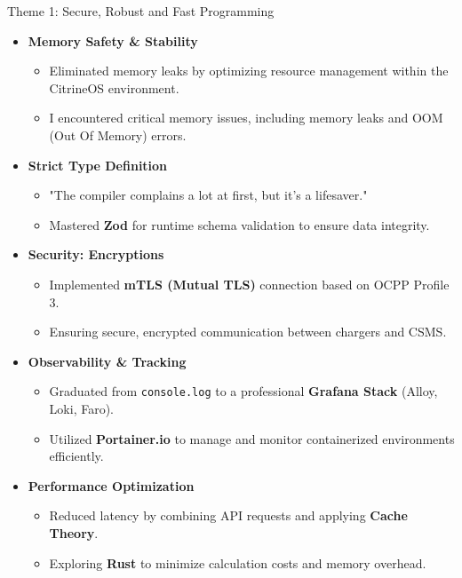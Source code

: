\documentclass[11pt]{beamer}
\begin{document}
\begin{frame}[allowframebreaks]{Theme 1: Secure, Robust and Fast Programming}
    \begin{itemize}
        \item \textbf{Memory Safety \& Stability}
            \begin{itemize}
                \item Eliminated memory leaks by optimizing resource management within the CitrineOS environment.
                \item I encountered critical memory issues, including memory leaks and OOM (Out Of Memory) errors.
            \end{itemize}
        \item \textbf{Strict Type Definition}
            \begin{itemize}
                \item "The compiler complains a lot at first, but it's a lifesaver."
                \item Mastered \textbf{Zod} for runtime schema validation to ensure data integrity.
            \end{itemize}
        \item \textbf{Security: Encryptions}
            \begin{itemize}
                \item Implemented \textbf{mTLS (Mutual TLS)} connection based on OCPP Profile 3.
                \item Ensuring secure, encrypted communication between chargers and CSMS.
            \end{itemize}

    \framebreak 

        \item \textbf{Observability \& Tracking}
            \begin{itemize}
                \item Graduated from \texttt{console.log} to a professional \textbf{Grafana Stack} (Alloy, Loki, Faro).
                \item Utilized \textbf{Portainer.io} to manage and monitor containerized environments efficiently.
            \end{itemize}
        \item \textbf{Performance Optimization}
            \begin{itemize}
                \item Reduced latency by combining API requests and applying \textbf{Cache Theory}.
                \item Exploring \textbf{Rust} to minimize calculation costs and memory overhead.
            \end{itemize}
    \end{itemize}


\end{frame}
\end{document}
